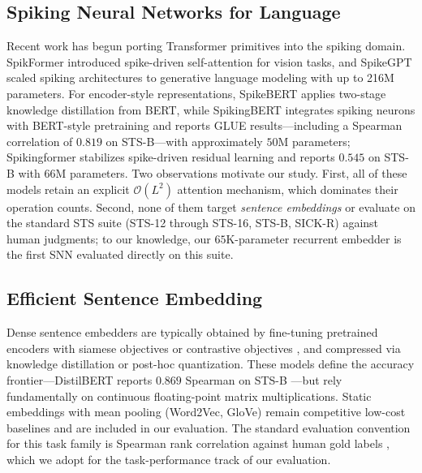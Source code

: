 \documentclass[10pt]{article} %
\begin{document}
\subsection{Spiking Neural Networks for Language}
Recent work has begun porting Transformer primitives into the spiking domain. SpikFormer \citep{zhou2023spikformer} introduced spike-driven self-attention for vision tasks, and SpikeGPT \citep{zhu2023spikegpt} scaled spiking architectures to generative language modeling with up to 216M parameters. For encoder-style representations, SpikeBERT \citep{lv2023spikebert} applies two-stage knowledge distillation from BERT, while SpikingBERT \citep{bal2024spikingbert} integrates spiking neurons with BERT-style pretraining and reports GLUE results---including a Spearman correlation of $0.819$ on STS-B---with approximately $50$M parameters; Spikingformer \citep{zhou2025spikingformer} stabilizes spike-driven residual learning and reports $0.545$ on STS-B with $66$M parameters. Two observations motivate our study. First, all of these models retain an explicit $\mathcal{O}(L^2)$ attention mechanism, which dominates their operation counts. Second, none of them target \emph{sentence embeddings} or evaluate on the standard STS suite (STS-12 through STS-16, STS-B, SICK-R) against human judgments; to our knowledge, our $65$K-parameter recurrent embedder is the first SNN evaluated directly on this suite.

\subsection{Efficient Sentence Embedding}
Dense sentence embedders are typically obtained by fine-tuning pretrained encoders with siamese objectives \citep{reimers2019sentence} or contrastive objectives \citep{gao2021simcse}, and compressed via knowledge distillation \citep{hinton2015distilling, sanh2019distilbert, wang2020minilm} or post-hoc quantization. These models define the accuracy frontier---DistilBERT reports $0.869$ Spearman on STS-B \citep{sanh2019distilbert}---but rely fundamentally on continuous floating-point matrix multiplications. Static embeddings with mean pooling (Word2Vec, GloVe) remain competitive low-cost baselines and are included in our evaluation. The standard evaluation convention for this task family is Spearman rank correlation against human gold labels \citep{muennighoff2022mteb, cer2017semeval}, which we adopt for the task-performance track of our evaluation.
\end{document}
